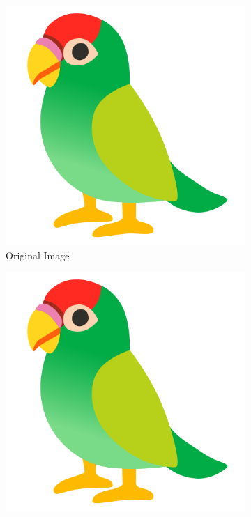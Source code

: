 \documentclass{article}
\begin{document}
	\begin{figure}
		\centering
		\begin{subfigure}{0.3\textwidth}
			\centering
			\includegraphics[width=\textwidth]{images/parrot.png}
			\caption{Original Image}
		\end{subfigure}
		\hfill
		\begin{subfigure}{0.3\textwidth}%
			\centering
			\includegraphics[width=\textwidth, angle=90]{images/parrot.png}

\end{subfigure}
\end{figure}
\end{document}
